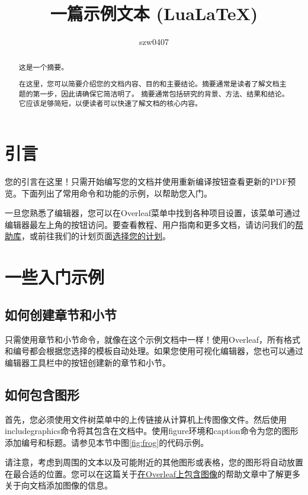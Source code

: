 \documentclass{article}
\title{一篇示例文本 (LuaLaTeX)}
\author{szw0407}
\begin{document}
\maketitle

\begin{abstract}
    这是一个摘要。

    在这里，您可以简要介绍您的文档内容、目的和主要结论。摘要通常是读者了解文档主题的第一步，因此请确保它简洁明了。
    摘要通常包括研究的背景、方法、结果和结论。它应该足够简短，以便读者可以快速了解文档的核心内容。
\end{abstract}
\tableofcontents
\newpage
\section{引言}

您的引言在这里！只需开始编写您的文档并使用重新编译按钮查看更新的PDF预览。下面列出了常用命令和功能的示例，以帮助您入门。

一旦您熟悉了编辑器，您可以在Overleaf菜单中找到各种项目设置，该菜单可通过编辑器最左上角的按钮访问。要查看教程、用户指南和更多文档，请访问我们的\href{https://www.overleaf.com/learn}{帮助库}，或前往我们的计划页面\href{https://www.overleaf.com/user/subscription/plans}{选择您的计划}。

\section{一些入门示例}

\subsection{如何创建章节和小节}

只需使用章节和小节命令，就像在这个示例文档中一样！使用Overleaf，所有格式和编号都会根据您选择的模板自动处理。如果您使用可视化编辑器，您也可以通过编辑器工具栏中的按钮创建新的章节和小节。

\subsection{如何包含图形}

首先，您必须使用文件树菜单中的上传链接从计算机上传图像文件。然后使用includegraphics命令将其包含在文档中。使用figure环境和caption命令为您的图形添加编号和标题。请参见本节中图\ref{fig:frog}的代码示例。

请注意，考虑到周围的文本以及可能附近的其他图形或表格，您的图形将自动放置在最合适的位置。您可以在这篇关于\href{https://www.overleaf.com/learn/how-to/Including_images_on_Overleaf}{在Overleaf上包含图像}的帮助文章中了解更多关于向文档添加图像的信息。
\end{document}
